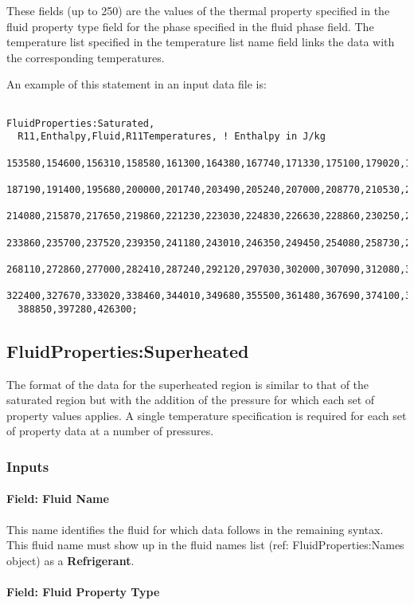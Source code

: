 These fields (up to 250) are the values of the thermal property specified in the fluid property type field for the phase specified in the fluid phase field. The temperature list specified in the temperature list name field links the data with the corresponding temperatures.

An example of this statement in an input data file is:

\begin{lstlisting}

FluidProperties:Saturated,
  R11,Enthalpy,Fluid,R11Temperatures, ! Enthalpy in J/kg
  153580,154600,156310,158580,161300,164380,167740,171330,175100,179020,183060,
  187190,191400,195680,200000,201740,203490,205240,207000,208770,210530,212310,
  214080,215870,217650,219860,221230,223030,224830,226630,228860,230250,232060,
  233860,235700,237520,239350,241180,243010,246350,249450,254080,258730,263480,
  268110,272860,277000,282410,287240,292120,297030,302000,307090,312080,317210,
  322400,327670,333020,338460,344010,349680,355500,361480,367690,374100,381060,
  388850,397280,426300;
\end{lstlisting}

\subsection{FluidProperties:Superheated}\label{fluidpropertiessuperheated}

The format of the data for the superheated region is similar to that of the saturated region but with the addition of the pressure for which each set of property values applies. A single temperature specification is required for each set of property data at a number of pressures.

\subsubsection{Inputs}\label{inputs-4-014}

\paragraph{Field: Fluid Name}\label{field-fluid-name-1}

This name identifies the fluid for which data follows in the remaining syntax. This fluid name must show up in the fluid names list (ref: FluidProperties:Names object) as a \textbf{Refrigerant}.

\paragraph{Field: Fluid Property Type}\label{field-fluid-property-type-1}

